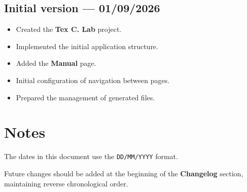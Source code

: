 ﻿\documentclass[11pt,a4paper]{article}
\newcommand{\software}{\textbf{Tex C. Lab}}
\begin{document}
\subsection*{Initial version --- 01/09/2026}


\begin{itemize}[leftmargin=*]
    \item Created the \software{} project.
    \item Implemented the initial application structure.
    \item Added the \textbf{Manual} page.
    \item Initial configuration of navigation between pages.
    \item Prepared the management of generated files.
\end{itemize}

\section{Notes}

The dates in this document use the
\texttt{DD/MM/YYYY} format.

Future changes should be added at the beginning of the
\textbf{Changelog} section, maintaining reverse chronological order.
\end{document}
